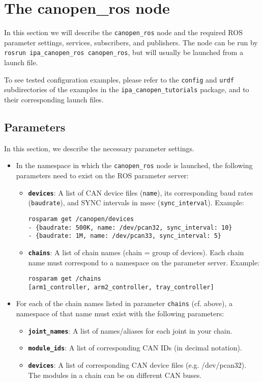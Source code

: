 \section{The canopen\_ros node}

In this section we will describe the \texttt {canopen\_ros} node and the required ROS parameter settings, services, subscribers, and publishers. The node can be run by \texttt{rosrun ipa\_canopen\_ros canopen\_ros}, but will usually be launched from a launch file.

To see tested configuration examples, please refer to the \texttt{config} and \texttt{urdf} subdirectories of the examples in the \texttt{ipa\_canopen\_tutorials} package, and to their corresponding launch files.

\subsection{Parameters}

In this section, we describe the necessary parameter settings. 
\begin{itemize}
\item In the namespace in which the \texttt{canopen\_ros} node is launched, the following parameters need to exist on the ROS parameter server:
  \begin{itemize}
  \item {\bf \texttt{devices}}: A list of CAN device files (\texttt{name}), its corresponding baud rates (\texttt{baudrate}), and SYNC intervals in msec (\texttt{sync\_interval}). Example:
\begin{verbatim}
rosparam get /canopen/devices 
- {baudrate: 500K, name: /dev/pcan32, sync_interval: 10}
- {baudrate: 1M, name: /dev/pcan33, sync_interval: 5}
\end{verbatim}
\item {\bf \texttt{chains}}: A list of chain names (chain = group of devices). Each chain name must correspond to a namespace on the parameter server. Example:
\begin{verbatim}
rosparam get /chains
[arm1_controller, arm2_controller, tray_controller]
\end{verbatim}
  \end{itemize}
\item For each of the chain names listed in parameter \texttt{chains} (cf. above), a namespace of that name must exist with the following parameters:
  \begin{itemize}
  \item {\bf \texttt{joint\_names}}: A list of names/aliases for each joint in your chain.
  \item {\bf \texttt{module\_ids}}: A list of corresponding CAN IDs (in decimal notation).
  \item {\bf \texttt{devices}}: A list of corresponding CAN device files (e.g. /dev/pcan32). The modules in a chain can be on different CAN buses.
  \end{itemize}

\end{itemize}

